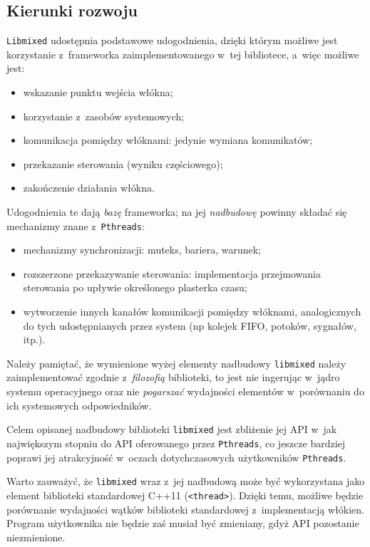 \documentclass[12pt]{mwart}
\newcommand{\code}{\texttt}
\begin{document}
\subsection{Kierunki rozwoju}
\indent
  \code{Libmixed} udostępnia podstawowe udogodnienia, dzięki którym możliwe jest korzystanie z~frameworka zaimplementowanego w~tej bibliotece,
  a~więc możliwe jest:
  \begin{itemize}
    \item wskazanie punktu wejścia włókna;
    \item korzystanie z~zasobów systemowych;
    \item komunikacja pomiędzy włóknami: jedynie wymiana komunikatów;
    \item przekazanie sterowania (wyniku częściowego);
    \item zakończenie działania włókna.
  \end{itemize}
  Udogodnienia te dają \emph{bazę} frameworka; na jej \emph{nadbudowę} powinny składać się mechanizmy znane z~\code{Pthreads}:
  \begin{itemize}
    \item mechanizmy synchronizacji: muteks, bariera, warunek;
    \item rozszerzone przekazywanie sterowania: implementacja przejmowania sterowania po upływie określonego plasterka czasu;
    \item wytworzenie innych kanałów komunikacji pomiędzy włóknami, analogicznych do tych udostępnianych przez system (np kolejek FIFO, potoków, sygnałów, itp.).
  \end{itemize}
  Należy pamiętać, że wymienione wyżej elementy nadbudowy \code{libmixed} należy zaimplementować zgodnie z~\emph{filozofią} biblioteki, to jest nie ingerując
  w~jądro systemu operacyjnego oraz nie \emph{pogarszać} wydajności elementów w~porównaniu do ich systemowych odpowiedników.
\par
\indent
  Celem opisanej nadbudowy biblioteki \code{libmixed} jest zbliżenie jej API w~jak największym stopniu do API oferowanego przez \code{Pthreads},
  co jeszcze bardziej poprawi jej atrakcyjność w~oczach dotychczasowych użytkowników \code{Pthreads}.
\par
\indent
  Warto zauważyć, że \code{libmixed} wraz z~jej nadbudową może być wykorzystana jako element biblioteki
  standardowej C++11 (\code{<thread>}). Dzięki temu, możliwe będzie porównanie wydajności wątków biblioteki standardowej z~implementacją włókien.
  Program użytkownika nie będzie zaś musiał być zmieniany, gdyż API pozostanie niezmienione.
\par
%
\newpage
\rhead{\empty}

\end{document}
